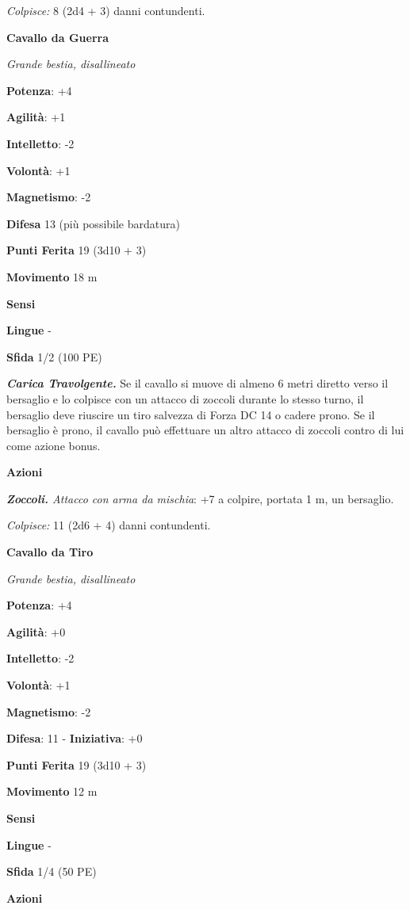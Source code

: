 \begin{multicols}{2}
\emph{Colpisce:} 8 (2d4 + 3) danni contundenti.



\textbf{Cavallo da Guerra}

\emph{Grande bestia, disallineato}

\textbf{Potenza}: +4

\textbf{Agilità}: +1

\textbf{Intelletto}: -2

\textbf{Volontà}: +1

\textbf{Magnetismo}: -2

\textbf{Difesa} 13 (più possibile bardatura)

\textbf{Punti Ferita} 19 (3d10 + 3)

\textbf{Movimento} 18 m

\textbf{Sensi} 

\textbf{Lingue} -

\textbf{Sfida} 1/2 (100 PE)\smallskip

\emph{\textbf{Carica Travolgente.}} Se il cavallo si muove di almeno 6
metri diretto verso il bersaglio e lo colpisce con un attacco di zoccoli
durante lo stesso turno, il bersaglio deve riuscire un tiro salvezza di Forza DC 14 o cadere prono. Se il bersaglio è prono, il cavallo può
effettuare un altro attacco di zoccoli contro di lui come azione bonus.

\smallskip\textbf{Azioni}

\emph{\textbf{Zoccoli.} Attacco con arma da mischia}: +7 a colpire,
portata 1 m, un bersaglio.

\emph{Colpisce:} 11 (2d6 + 4) danni contundenti.

\textbf{Cavallo da Tiro}

\emph{Grande bestia, disallineato}

\textbf{Potenza}: +4

\textbf{Agilità}: +0

\textbf{Intelletto}: -2

\textbf{Volontà}: +1

\textbf{Magnetismo}: -2

\textbf{Difesa}: 11 - \textbf{Iniziativa}: +0

\textbf{Punti Ferita} 19 (3d10 + 3)

\textbf{Movimento} 12 m

\textbf{Sensi} 

\textbf{Lingue} -

\textbf{Sfida} 1/4 (50 PE)\smallskip

\smallskip\textbf{Azioni}


\end{multicols}
